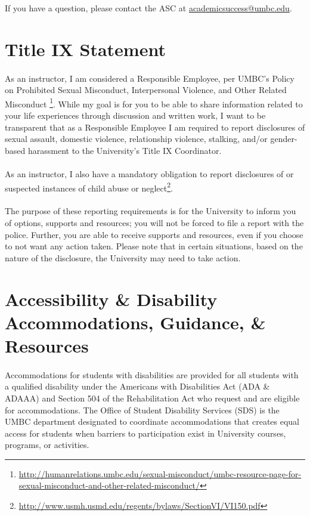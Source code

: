 \documentclass[letter,10pt]{article}
\begin{document}
If you have a question, please contact the ASC at \href{mailto:academicsuccess@umbc.edu}{academicsuccess@umbc.edu}.

\section*{Title IX Statement}
\paragraph{}As an instructor, I am considered a Responsible Employee, per UMBC’s Policy on Prohibited Sexual Misconduct, Interpersonal Violence, and Other Related Misconduct \footnote{\url{http://humanrelations.umbc.edu/sexual-misconduct/umbc-resource-page-for-sexual-misconduct-and-other-related-misconduct/}}. While my goal is for you to be able to share information related to your life experiences through discussion and written work, I want to be transparent that as a Responsible Employee I am required to report disclosures of sexual assault, domestic violence, relationship violence, stalking, and/or gender-based harassment to the University’s Title IX Coordinator.

\paragraph{}As an instructor, I also have a mandatory obligation to report disclosures of or suspected instances of child abuse or neglect\footnote{\url{http://www.usmh.usmd.edu/regents/bylaws/SectionVI/VI150.pdf}}.

\paragraph{}The purpose of these reporting requirements is for the University to inform you of options, supports and resources; you will not be forced to file a report with the police. Further, you are able to receive supports and resources, even if you choose to not want any action taken. Please note that in certain situations, based on the nature of the disclosure, the University may need to take action.

\section*{Accessibility \& Disability Accommodations, Guidance, \& Resources}
\paragraph{}Accommodations for students with disabilities are provided for all students with a qualified disability under the Americans with Disabilities Act (ADA \& ADAAA) and Section 504 of the Rehabilitation Act who request and are eligible for accommodations. The Office of Student Disability Services (SDS) is the UMBC department designated to coordinate accommodations that creates equal access for students when barriers to participation exist in University courses, programs, or activities.
\end{document}
